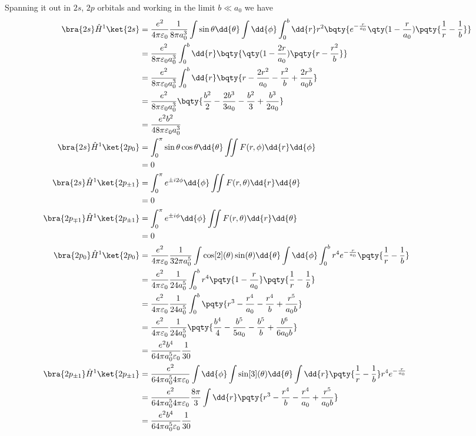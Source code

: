 \documentclass[12pt]{article}
\begin{document}
        Spanning it out in \(2s\), \(2p\) orbitals and working in the limit \( b \ll a_0\) we have \begin{align*}
            \bra{2s} \hat{H}^1 \ket{2s} &= \frac{e^2}{4\pi\varepsilon_0} \frac{1}{8\pi a_0^3} \int \sin \theta \dd{\theta} \int \dd{\phi} \int_0^b \dd{r} r^2\bqty{e^{ -\frac{r}{a_0}}\qty(1 - \frac{r}{a_0})\pqty{\frac{1}{r} - \frac{1}{b}}}\\
            &= \frac{e^2}{8\pi\varepsilon_0 a_0^3} \int_0^b \dd{r}\bqty{\qty(1 - \frac{2r}{a_0})\pqty{ r - \frac{r^2}{b}}}\\
            &= \frac{e^2}{8\pi\varepsilon_0 a_0^3} \int_0^b \dd{r}\bqty{r - \frac{2r^2}{a_0} - \frac{r^2}{b} + \frac{2r^3}{a_0b}}\\
            &= \frac{e^2}{8\pi\varepsilon_0 a_0^3} \bqty{\frac{b^2}{2} - \frac{2b^3}{3a_0} - \frac{b^2}{3} + \frac{b^3}{2a_0}}\\
            &= \frac{e^2 b^2}{48\pi\varepsilon_0 a_0^3}\\
            \bra{2s} \hat{H}^1 \ket{2p_{0}} &= \int_0^\pi \sin\theta\cos \theta\dd{\theta} \iint F(r,\phi) \dd{r} \dd{\phi}\\
            &= 0\\
            \bra{2s} \hat{H}^1 \ket{2p_{\pm 1}} &= \int_0^\pi e^{\pm i 2\phi}\dd{\phi} \iint F(r,\theta) \dd{r} \dd{\theta}\\
            &= 0\\
            \bra{2p_{\mp 1}} \hat{H}^1 \ket{2p_{\pm 1}} &= \int_0^\pi e^{\pm i\phi}\dd{\phi} \iint F(r,\theta) \dd{r} \dd{\theta}\\
            &= 0\\
            \bra{2p_0} \hat{H}^1 \ket{2p_0} &= \frac{e^2}{4\pi\varepsilon_0} \frac{1}{32\pi a_0^5} \int \cos[2](\theta) \sin(\theta) \dd{\theta} \int \dd{\phi} \int_0^b r^4 e^{ - \frac{r}{a_0}}\pqty{\frac{1}{r} - \frac{1}{b}}\\
            &= \frac{e^2}{4\pi\varepsilon_0} \frac{1}{24 a_0^5} \int_0^b r^4 \pqty{1 - \frac{r}{a_0}}\pqty{\frac{1}{r} - \frac{1}{b}}\\
            &= \frac{e^2}{4\pi\varepsilon_0} \frac{1}{24 a_0^5} \int_0^b \pqty{r^3 - \frac{r^4}{a_0} - \frac{r^4}{b} + \frac{r^5}{a_0b}}\\
            &= \frac{e^2}{4\pi\varepsilon_0} \frac{1}{24 a_0^5} \pqty{\frac{b^4}{4} - \frac{b^5}{5a_0} - \frac{b^5}{b} + \frac{b^6}{6a_0b}}\\
            &= \frac{e^2b^4}{64\pi a_0^5 \varepsilon_0} \frac{1}{30}\\
            \bra{2p_{\pm 1}} \hat{H}^1 \ket{2p_{\pm 1}} &= \frac{e^2}{64\pi a_0^5 4\pi\varepsilon_0} \int \dd{\phi} \int \sin[3](\theta) \dd{\theta} \int \dd{r} \pqty{\frac{1}{r} - \frac{1}{b}}r^4 e^{ - \frac{r}{a_0}}\\
            &= \frac{e^2}{64\pi a_0^5 4\pi\varepsilon_0} \frac{8\pi}{3}  \int \dd{r} \pqty{r^3 - \frac{r^4}{b} - \frac{r^4}{a_0} + \frac{r^5}{a_0 b}}\\
            &= \frac{e^2 b^4}{64\pi a_0^5\varepsilon_0} \frac{1}{30}
        \end{align*}
\end{document}
